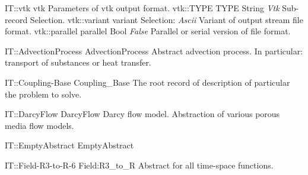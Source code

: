 \begin{RecordType}
	{IT::vtk}
	{vtk}
	{} %
	{} %
	{{{Parameters of vtk output format.}}}
		\RecKey
			{vtk::TYPE}
			{TYPE}
			{{String}}
			{ \it{Vtk} }
			{{{Sub-record Selection.}}}
		\RecKey
			{vtk::variant}
			{variant}
			{{Selection}{: }}
			{ \it{Ascii} }
			{{{Variant of output stream file format.}}}
		\RecKey
			{vtk::parallel}
			{parallel}
			{{Bool}}
			{ \it{False} }
			{{{Parallel or serial version of file format.}}}
\end{RecordType}
\begin{AbstractType}
	{IT::AdvectionProcess}
	{AdvectionProcess}
	{}
	{{{Abstract advection process. In particular: transport of substances or heat transfer.}}}
\end{AbstractType}
\begin{AbstractType}
	{IT::Coupling-Base}
	{Coupling{\_}Base}
	{}
	{{{The root record of description of particular the problem to solve.}}}
\end{AbstractType}
\begin{AbstractType}
	{IT::DarcyFlow}
	{DarcyFlow}
	{}
	{{{Darcy flow model. Abstraction of various porous media flow models.}}}
\end{AbstractType}
\begin{AbstractType}
	{IT::EmptyAbstract}
	{EmptyAbstract}
	{}
	{}
\end{AbstractType}
\begin{AbstractType}
	{IT::Field-R3-to-R-6}
	{Field:R3{\_}to{\_}R}
	{}
	{{{Abstract for all time-space functions.}}}
\end{AbstractType}
